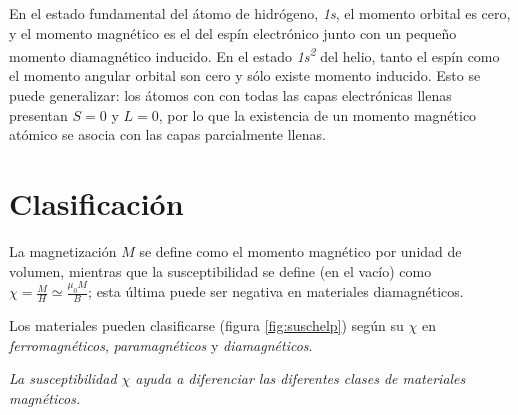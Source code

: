 \documentclass{tufte-book}
\begin{document}
En el estado fundamental del átomo de hidrógeno, \textit{1s}, el
momento orbital es cero, y el momento magnético es el del espín
electrónico junto con un pequeño momento diamagnético inducido. En el
estado \textit{1s\textsuperscript{2}} del helio, tanto el espín como
el momento angular orbital son cero y sólo existe momento inducido.
Esto se puede generalizar: los átomos con con todas las capas
electrónicas llenas presentan $S = 0$ y $L = 0$, por lo que la
existencia de un momento magnético atómico se asocia con las capas
parcialmente llenas.



\section{Clasificación}

La magnetización $M$ se define como el momento magnético por unidad de
volumen, mientras que la susceptibilidad se define (en el vacío) como
$χ=\frac{M}{H}≃\frac{μ_0M}{B}$; esta última puede ser negativa en
materiales diamagnéticos.

Los materiales pueden clasificarse (figura \ref{fig:suschelp}) según
su $χ$ en \emph{ferromagnéticos}, \emph{paramagnéticos} y
\emph{diamagnéticos}.

\begin{marginfigure}
  \centering
  \caption{\itshape La susceptibilidad $χ$ ayuda a diferenciar las diferentes
    clases de materiales magnéticos.}
  \label{fig:suschelp}
\end{marginfigure}
\end{document}
